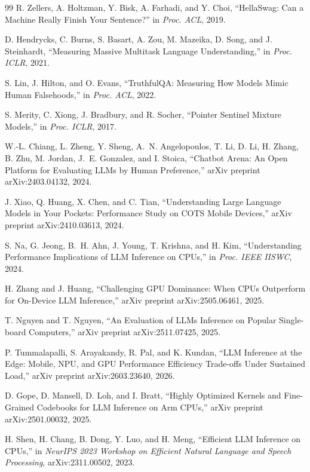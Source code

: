 \documentclass[conference]{IEEEtran}
\begin{document}
\begin{thebibliography}{99}
R. Zellers, A. Holtzman, Y. Bisk, A. Farhadi, and Y. Choi,
``HellaSwag: Can a Machine Really Finish Your Sentence?''
in \textit{Proc. ACL}, 2019.

D. Hendrycks, C. Burns, S. Basart, A. Zou, M. Mazeika, D. Song,
and J. Steinhardt,
``Measuring Massive Multitask Language Understanding,''
in \textit{Proc. ICLR}, 2021.

S. Lin, J. Hilton, and O. Evans,
``TruthfulQA: Measuring How Models Mimic Human Falsehoods,''
in \textit{Proc. ACL}, 2022.

S. Merity, C. Xiong, J. Bradbury, and R. Socher,
``Pointer Sentinel Mixture Models,''
in \textit{Proc. ICLR}, 2017.

W.-L. Chiang, L. Zheng, Y. Sheng, A.~N. Angelopoulos, T. Li,
D. Li, H. Zhang, B. Zhu, M. Jordan, J.~E. Gonzalez, and I. Stoica,
``Chatbot Arena: An Open Platform for Evaluating LLMs by Human Preference,''
arXiv preprint arXiv:2403.04132, 2024.

J. Xiao, Q. Huang, X. Chen, and C. Tian,
``Understanding Large Language Models in Your Pockets: Performance Study on COTS Mobile Devices,''
arXiv preprint arXiv:2410.03613, 2024.

S. Na, G. Jeong, B.~H. Ahn, J. Young, T. Krishna, and H. Kim,
``Understanding Performance Implications of LLM Inference on CPUs,''
in \textit{Proc. IEEE IISWC}, 2024.

H. Zhang and J. Huang,
``Challenging GPU Dominance: When CPUs Outperform for On-Device LLM Inference,''
arXiv preprint arXiv:2505.06461, 2025.

T. Nguyen and T. Nguyen,
``An Evaluation of LLMs Inference on Popular Single-board Computers,''
arXiv preprint arXiv:2511.07425, 2025.

P. Tummalapalli, S. Arayakandy, R. Pal, and K. Kundan,
``LLM Inference at the Edge: Mobile, NPU, and GPU Performance Efficiency Trade-offs
Under Sustained Load,''
arXiv preprint arXiv:2603.23640, 2026.

D. Gope, D. Mansell, D. Loh, and I. Bratt,
``Highly Optimized Kernels and Fine-Grained Codebooks for LLM Inference on Arm CPUs,''
arXiv preprint arXiv:2501.00032, 2025.

H. Shen, H. Chang, B. Dong, Y. Luo, and H. Meng,
``Efficient LLM Inference on CPUs,''
in \textit{NeurIPS 2023 Workshop on Efficient Natural Language and Speech Processing},
arXiv:2311.00502, 2023.


\end{thebibliography}
\end{document}
